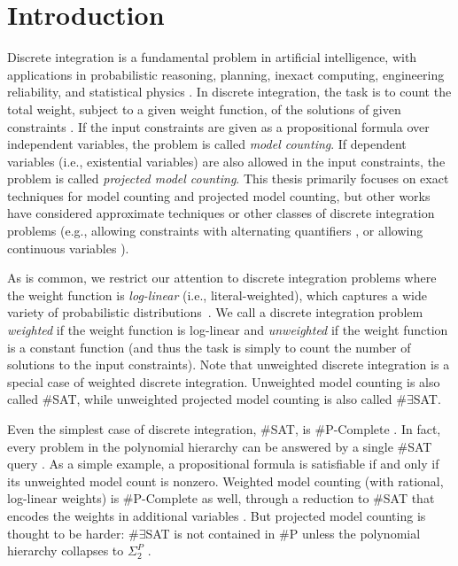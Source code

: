 \chapter{Introduction}
\label{ch:intro}
Discrete integration is a fundamental problem in artificial intelligence, with applications in probabilistic reasoning, planning, inexact computing, engineering reliability, and statistical physics \cite{Bacchus2003,DH07,GSS08,naveh2007constraint}. In discrete integration, the task is to count the total weight, subject to a given weight function, of the solutions of given constraints \cite{GSS08}. 
If the input constraints are given as a propositional formula over independent variables, the problem is called \emph{model counting}.
If dependent variables (i.e., existential variables) are also allowed in the input constraints, the problem is called \emph{projected model counting}. This thesis primarily focuses on exact techniques for model counting and projected model counting, but other works have considered approximate techniques \cite{CMV21} or other classes of discrete integration problems (e.g., allowing constraints with alternating quantifiers \cite{stearns2002exploiting,KNR16}, or allowing continuous variables \cite{BPV15}).

As is common, we restrict our attention to discrete integration problems where the weight function is \emph{log-linear} (i.e., literal-weighted), which captures a wide variety of probabilistic distributions~\cite{KF09}.
We call a discrete integration problem \emph{weighted} if the weight function is log-linear and \emph{unweighted} if the weight function is a constant function (and thus the task is simply to count the number of solutions to the input constraints).
Note that unweighted discrete integration is a special case of weighted discrete integration.
Unweighted model counting is also called \#SAT, while unweighted projected model counting is also called $\#\exists$SAT.

Even the simplest case of discrete integration, \#SAT, is \#P-Complete \cite{Valiant79}. 
In fact, every problem in the polynomial hierarchy can be answered by a single \#SAT query \cite{toda89}. 
As a simple example, a propositional formula is satisfiable if and only if its unweighted model count is nonzero.
Weighted model counting (with rational, log-linear weights) is \#P-Complete as well, through a reduction to \#SAT that encodes the weights in additional variables \cite{CFMV15,DFM20}.
But projected model counting is thought to be harder: $\#\exists$SAT is not contained in $\#$P unless the polynomial hierarchy collapses to $\Sigma_2^P$ \cite{zawadzki2013generalization}.

